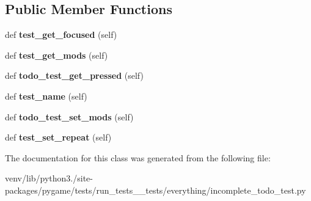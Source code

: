 \subsection*{Public Member Functions}
\begin{DoxyCompactItemize}
\item 
\mbox{\label{classpygame_1_1tests_1_1run__tests____tests_1_1everything_1_1incomplete__todo__test_1_1_key_module_test_a9527b01e637df2e029b011ff0f8e997c}} 
def {\bfseries test\+\_\+get\+\_\+focused} (self)
\item 
\mbox{\label{classpygame_1_1tests_1_1run__tests____tests_1_1everything_1_1incomplete__todo__test_1_1_key_module_test_a674c29d8b07abd71f648fa6f5eeb3025}} 
def {\bfseries test\+\_\+get\+\_\+mods} (self)
\item 
\mbox{\label{classpygame_1_1tests_1_1run__tests____tests_1_1everything_1_1incomplete__todo__test_1_1_key_module_test_adfcae31bdbaf6900f64655a746224c3a}} 
def {\bfseries todo\+\_\+test\+\_\+get\+\_\+pressed} (self)
\item 
\mbox{\label{classpygame_1_1tests_1_1run__tests____tests_1_1everything_1_1incomplete__todo__test_1_1_key_module_test_a565f7a4808dc57124f03013679e3cd85}} 
def {\bfseries test\+\_\+name} (self)
\item 
\mbox{\label{classpygame_1_1tests_1_1run__tests____tests_1_1everything_1_1incomplete__todo__test_1_1_key_module_test_a44e2703b581e8d0b5cb5db09e29c0180}} 
def {\bfseries todo\+\_\+test\+\_\+set\+\_\+mods} (self)
\item 
\mbox{\label{classpygame_1_1tests_1_1run__tests____tests_1_1everything_1_1incomplete__todo__test_1_1_key_module_test_a6f07c4b3bb993fa95f2ee82ae20380e9}} 
def {\bfseries test\+\_\+set\+\_\+repeat} (self)
\end{DoxyCompactItemize}


The documentation for this class was generated from the following file\+:\begin{DoxyCompactItemize}
\item 
venv/lib/python3./site-\/packages/pygame/tests/run\+\_\+tests\+\_\+\+\_\+tests/everything/incomplete\+\_\+todo\+\_\+test.\+py\end{DoxyCompactItemize}
